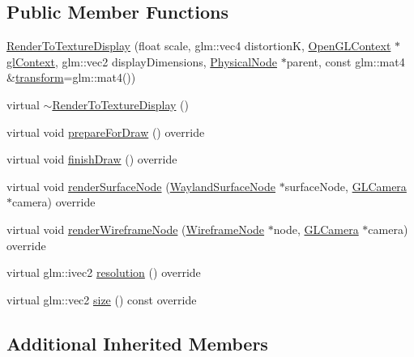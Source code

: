 \subsection*{Public Member Functions}
\begin{DoxyCompactItemize}
\item 
\hyperlink{classmotorcar_1_1RenderToTextureDisplay_a9c79fc8d2429e8b15c0353a5a9fce42f}{Render\-To\-Texture\-Display} (float scale, glm\-::vec4 distortion\-K, \hyperlink{classmotorcar_1_1OpenGLContext}{Open\-G\-L\-Context} $\ast$\hyperlink{classmotorcar_1_1Display_a884dd0b78dbecee82a33eb6d26a2a403}{gl\-Context}, glm\-::vec2 display\-Dimensions, \hyperlink{classmotorcar_1_1PhysicalNode}{Physical\-Node} $\ast$parent, const glm\-::mat4 \&\hyperlink{classmotorcar_1_1SceneGraphNode_ad96e79fdd739ac8223a3128003be391a}{transform}=glm\-::mat4())
\item 
virtual \hyperlink{classmotorcar_1_1RenderToTextureDisplay_a9cb7b619ef7450f8c208961d83671998}{$\sim$\-Render\-To\-Texture\-Display} ()
\item 
virtual void \hyperlink{classmotorcar_1_1RenderToTextureDisplay_abdf6861fe69ada64fafd0a7713391bed}{prepare\-For\-Draw} () override
\item 
virtual void \hyperlink{classmotorcar_1_1RenderToTextureDisplay_a5a312b98ac49013155797e814e6cf69e}{finish\-Draw} () override
\item 
virtual void \hyperlink{classmotorcar_1_1RenderToTextureDisplay_ad1ebd8928e00156ed06a2fcaf227ff56}{render\-Surface\-Node} (\hyperlink{classmotorcar_1_1WaylandSurfaceNode}{Wayland\-Surface\-Node} $\ast$surface\-Node, \hyperlink{classmotorcar_1_1GLCamera}{G\-L\-Camera} $\ast$camera) override
\item 
virtual void \hyperlink{classmotorcar_1_1RenderToTextureDisplay_a8e2f1f1bc62cd5fdea0dc00ef3dcd2fc}{render\-Wireframe\-Node} (\hyperlink{classmotorcar_1_1WireframeNode}{Wireframe\-Node} $\ast$node, \hyperlink{classmotorcar_1_1GLCamera}{G\-L\-Camera} $\ast$camera) override
\item 
virtual glm\-::ivec2 \hyperlink{classmotorcar_1_1RenderToTextureDisplay_a51b948b6feba962d622e1926d2bdade1}{resolution} () override
\item 
virtual glm\-::vec2 \hyperlink{classmotorcar_1_1RenderToTextureDisplay_ae9b133818a6e3ced457319bfdf618f73}{size} () const override
\end{DoxyCompactItemize}
\subsection*{Additional Inherited Members}


